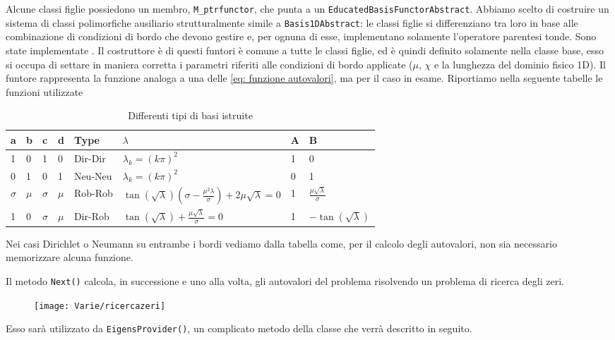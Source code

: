 Alcune classi figlie possiedono un membro, \texttt{M\_ptrfunctor}, che punta a un \texttt{EducatedBasisFunctorAbstract}. 
Abbiamo scelto di costruire un sistema di classi polimorfiche ausiliario strutturalmente simile a \texttt{Basis1DAbstract}:
le classi figlie si differenziano tra loro in base alle combinazione di condizioni di bordo che devono gestire e,
per ognuna di esse, implementano solamente l'operatore parentesi tonde. Sono state implementate .
Il costruttore \`e di questi funtori \`e comune a tutte le classi figlie, ed \`e quindi 
definito solamente nella classe base, esso si occupa di settare in maniera corretta i parametri riferiti alle condizioni di bordo applicate ($\mu
$, $\chi$ e la lunghezza del dominio fisico 1D). 
Il funtore rappresenta la funzione analoga a una delle \eqref{eq: funzione autovalori}, ma per il caso in esame.
Riportiamo nella seguente tabelle le funzioni utilizzate

\vspace{0.2cm}
\noindent
\begin{table}[!h]
\begin{tabular}{l l l l l l l l }
\toprule
a	&b	&c		&d	&Type		&$\lambda$ 					 				&A&B\\
\midrule
1	&0	&1		&0	&Dir-Dir	&$\lambda_k=(k\pi)^2$						&1&0\\
0	&1	&0		&1	&Neu-Neu	&$\lambda_k=(k\pi)^2$						&0&1\\
$\sigma$&$\mu$	&$\sigma$	&$\mu$	&Rob-Rob		&$\tan{(\sqrt{\lambda})}
(\sigma-\frac{\mu^2\lambda}{\sigma})+2\mu\sqrt{\lambda}=0$								&1&$\frac{\mu\sqrt{\lambda}}{\sigma}$\\
1	&0	&$\sigma$	&$\mu$	&Dir-Rob	&$\tan{(\sqrt{\lambda})}+\frac{\mu\sqrt{\lambda}}{\sigma}=0$	&1&$-\tan{(\sqrt{\lambda})}$  \\
\bottomrule
\end{tabular}
\caption{Differenti tipi di basi istruite}
\label{tab}
\end{table}
\vspace{0.2cm}

Nei casi Dirichlet o Neumann su entrambe i bordi vediamo dalla tabella come, 
per il calcolo degli autovalori, non sia necessario memorizzare alcuna funzione.

Il metodo \texttt{Next()} calcola, in successione e uno alla volta, gli autovalori del problema risolvendo un problema di 
ricerca degli zeri.
\begin{figure}[!h]
        \centering%
        \texttt{[image: Varie/ricercazeri]}
\end{figure}
Esso sar\`a utilizzato da \texttt{EigensProvider()}, un complicato metodo della classe  che verr\`a descritto in seguito.

